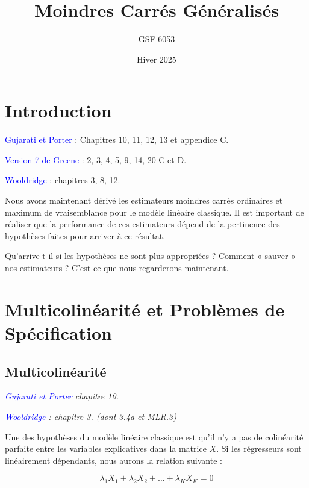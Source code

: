 \documentclass[14pt]{extarticle} %
\title{\Huge Moindres Carrés Généralisés}
\author{GSF-6053}
\date{Hiver 2025}
\theoremstyle{definition}
\theoremstyle{plain}
\newcommand{\livre}[1]{\textcolor{blue}{#1}}
\begin{document}
\maketitle

\tableofcontents
\newpage

\onehalfspacing

\section{Introduction}

\livre{Gujarati et Porter} : Chapitres 10, 11, 12, 13 et appendice C.

\livre{Version 7 de Greene} : 2, 3, 4, 5, 9, 14, 20 C et D.

\livre{Wooldridge} : chapitres 3, 8, 12.

Nous avons maintenant dérivé les estimateurs moindres carrés ordinaires et maximum de vraisemblance pour le modèle linéaire classique. Il est important de réaliser que la performance de ces estimateurs dépend de la pertinence des hypothèses faites pour arriver à ce résultat.

Qu’arrive-t-il si les hypothèses ne sont plus appropriées ? Comment « sauver » nos estimateurs ? C’est ce que nous regarderons maintenant.

\section{Multicolinéarité et Problèmes de Spécification}

\subsection{Multicolinéarité}

\textit{\livre{Gujarati et Porter} chapitre 10.}

\textit{\livre{Wooldridge} : chapitre 3. (dont 3.4a et MLR.3)}

Une des hypothèses du modèle linéaire classique est qu’il n’y a pas de colinéarité parfaite entre les variables explicatives dans la matrice $X$. Si les régresseurs sont linéairement dépendants, nous aurons la relation suivante :

\[
\lambda_1 X_1 + \lambda_2 X_2 + \dots + \lambda_K X_K = 0
\]
\end{document}
